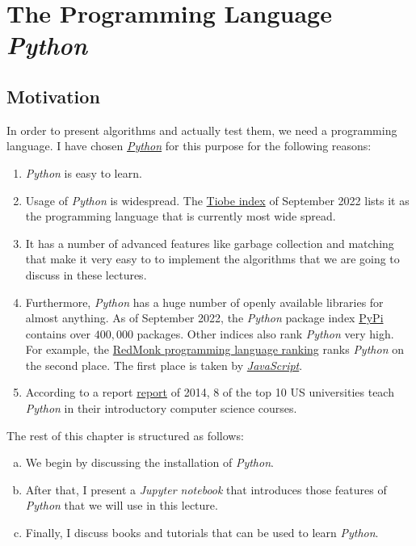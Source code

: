 \chapter{The Programming Language \textsl{Python}}
\section{Motivation}
In order to present algorithms and actually test them, we need a programming language.  I have chosen
\href{http://www.python.org}{\textsl{Python}} for this purpose for the following reasons:
\begin{enumerate}
\item \textsl{Python} is easy to learn.
\item Usage of \textsl{Python} is widespread.  The \href{https://www.tiobe.com/tiobe-index/}{Tiobe index}
      of September 2022 lists it as the programming language that is currently most wide spread.
\item It has a number of advanced features like garbage collection and matching that make it very easy to
      to implement the algorithms that we are going to discuss in these lectures.
\item Furthermore, \textsl{Python} has a huge number of openly available libraries for almost anything.
      As of September 2022, the \textsl{Python} package index \href{https://pypi.org}{PyPi} contains over
      $400,000$ packages.  Other indices also rank \textsl{Python} very high.  For example,
      the \href{https://redmonk.com/sogrady/2022/03/28/language-rankings-1-22/}{RedMonk programming language ranking}
      ranks \textsl{Python} on the second place.  The first place is taken by
      \href{https://www.javascript.com}{\textsl{JavaScript}}.
\item According to a report
      \href{https://cacm.acm.org/blogs/blog-cacm/176450-python-is-now-the-most-popular-introductory-teaching-language-at-top-u-s-universities/fulltext}{report} 
      of 2014, 8 of the top 10 US universities teach \textsl{Python} in their introductory computer science courses.
\end{enumerate}
The rest of this chapter is structured as follows:
\begin{enumerate}[(a)]
\item We begin by discussing the installation of \textsl{Python}.
\item After that, I present a \textsl{Jupyter notebook} that introduces those features of \textsl{Python} that
      we will use in this lecture.
\item Finally, I discuss books and tutorials that can be used to learn \textsl{Python}.  
\end{enumerate}

